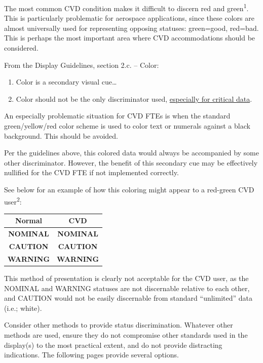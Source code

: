 \documentclass[
]{book}
\providecommand{\tightlist}{%
  \setlength{\itemsep}{0pt}\setlength{\parskip}{0pt}}
\begin{document}
The most common CVD condition makes it difficult to discern red and green\textsuperscript{1}. This is particularly problematic for aerospace applications, since these colors are almost universally used for representing opposing statuses: green=good, red=bad. This is perhaps the most important area where CVD accommodations should be considered.

From the Display Guidelines, section 2.c. -- Color:

\begin{enumerate}
\def\labelenumi{\arabic{enumi}.}
\tightlist
\item
  Color is a secondary visual cue\ldots{}
\item
  Color should not be the only discriminator used, \underline{especially for critical data}.
\end{enumerate}

An especially problematic situation for CVD FTEs is when the standard green/yellow/red color scheme is used to color text or numerals against a black background. This should be avoided.

Per the guidelines above, this colored data would always be accompanied by some other discriminator. However, the benefit of this secondary cue may be effectively nullified for the CVD FTE if not implemented correctly.

See below for an example of how this coloring might appear to a red-green CVD user\textsuperscript{2}:

\begin{longtable}[]{@{}cc@{}}
\toprule
Normal & CVD\tabularnewline
\midrule
\endhead
\textbf{\colorbox[HTML]{000000}{\textcolor[HTML]{00C000}{NOMINAL}}} & \textbf{\colorbox[HTML]{000000}{\textcolor[HTML]{908221}{NOMINAL}}}\tabularnewline
\textbf{\colorbox[HTML]{000000}{\textcolor[HTML]{FFF000}{CAUTION}}} & \textbf{\colorbox[HTML]{000000}{\textcolor[HTML]{FFF7D1}{CAUTION}}}\tabularnewline
\textbf{\colorbox[HTML]{000000}{\textcolor[HTML]{FF0000}{WARNING}}} & \textbf{\colorbox[HTML]{000000}{\textcolor[HTML]{908221}{WARNING}}}\tabularnewline
\bottomrule
\end{longtable}

This method of presentation is clearly not acceptable for the CVD user, as the NOMINAL and WARNING statuses are not discernable relative to each other, and CAUTION would not be easily discernable from standard ``unlimited'' data (i.e.; white).

Consider other methods to provide status discrimination. Whatever other methods are used, ensure they do not compromise other standards used in the display(s) to the most practical extent, and do not provide distracting indications. The following pages provide several options.
\end{document}
